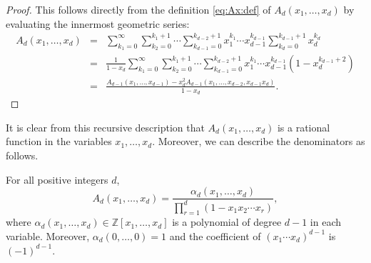 \documentclass[11pt]{article}
\theoremstyle{plain}
\theoremstyle{definition}
\begin{document}
\begin{proof}
  This follows directly from the definition \eqref{eq:Ax:def} of $A_d (x_1,
  \ldots, x_d)$ by evaluating the innermost geometric series:
  \begin{eqnarray*}
    A_d (x_1, \ldots, x_d) & = & \sum_{k_1 = 0}^{\infty} \sum_{k_2 = 0}^{k_1 +
    1} \cdots \sum_{k_{d - 1} = 0}^{k_{d - 2} + 1} x_1^{k_1} \cdots x_{d -
    1}^{k_{d - 1}} \sum_{k_d = 0}^{k_{d - 1} + 1} x_d^{k_d}\\
    & = & \frac{1}{1 - x_d} \sum_{k_1 = 0}^{\infty} \sum_{k_2 = 0}^{k_1 + 1}
    \cdots \sum_{k_{d - 1} = 0}^{k_{d - 2} + 1} x_1^{k_1} \cdots x_{d -
    1}^{k_{d - 1}} (1 - x_d^{k_{d - 1} + 2})\\
    & = & \frac{A_{d - 1} (x_1, \ldots, x_{d - 1}) - x_d^2 A_{d - 1} (x_1,
    \ldots, x_{d - 2}, x_{d - 1} x_d)}{1 - x_d} .
  \end{eqnarray*}
  
\end{proof}

It is clear from this recursive description that $A_d (x_1, \ldots, x_d)$ is a
rational function in the variables $x_1, \ldots, x_d$. Moreover, we can
describe the denominators as follows.

\begin{lemma}
  $\label{lem:Ax:denom}$For all positive integers $d$,
  \begin{equation}
    A_d (x_1, \ldots, x_d) = \frac{\alpha_d (x_1, \ldots, x_d)}{\prod_{r =
    1}^d (1 - x_1 x_2 \cdots x_r) }, \label{eq:Ax:denom}
  \end{equation}
  where $\alpha_d (x_1, \ldots, x_d) \in \mathbb{Z} [x_1, \ldots, x_d]$ is a
  polynomial of degree $d - 1$ in each variable. Moreover, $\alpha_d (0,
  \ldots, 0) = 1$ and the coefficient of $(x_1 \cdots x_d)^{d - 1}$ is $(-
  1)^{d - 1}$.
\end{lemma}
\end{document}
